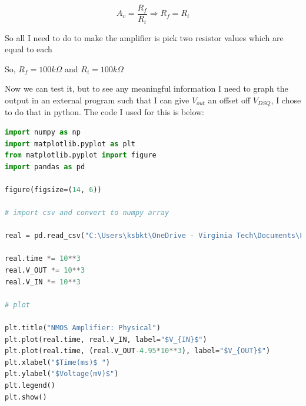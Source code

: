 \documentclass{article}
\begin{document}
\begin{equation}
    A_v = \frac{R_f}{R_i} \Rightarrow R_f = R_i
\end{equation}
\begin{center}
    So all I need to do to make the amplifier is pick two resistor values which are equal to each
    
    So, $\boxed{R_f = 100k\Omega}$ and $\boxed{R_i = 100k\Omega}$
\end{center}
\begin{center}
\end{center}
Now we can test it, but to see any meaningful information I need to graph the output in an external program such that I can give $V_{out}$ an offset off $V_{DSQ}$, I chose to do that in python. The code I used for this is below:
\begin{lstlisting}[language=Python, caption= Graphing Code]
import numpy as np
import matplotlib.pyplot as plt
from matplotlib.pyplot import figure
import pandas as pd

figure(figsize=(14, 6))

# import csv and convert to numpy array

real = pd.read_csv("C:\Users\ksbkt\OneDrive - Virginia Tech\Documents\Files\School\ECE2804\project\commonsource.csv", names=["time", "V_IN", "V_OUT"])

real.time *= 10**3
real.V_OUT *= 10**3
real.V_IN *= 10**3

# plot

plt.title("NMOS Amplifier: Physical")
plt.plot(real.time, real.V_IN, label="$V_{IN}$")
plt.plot(real.time, (real.V_OUT-4.95*10**3), label="$V_{OUT}$")
plt.xlabel("$Time(ms)$ ")
plt.ylabel("$Voltage(mV)$")
plt.legend()
plt.show()
\end{lstlisting}
\begin{center}
\end{center}
\end{document}
